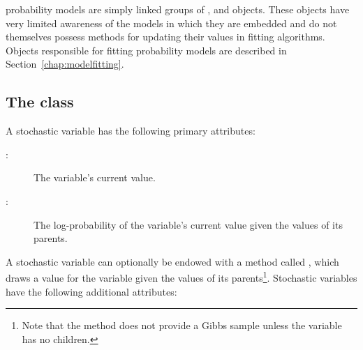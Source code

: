 \documentclass[]{jss}
\begin{document}
\medskip
{} probability models are simply linked groups of ,  and  objects. These objects have very limited awareness of the models in which they are embedded and do not themselves possess methods for updating their values in fitting algorithms. Objects responsible for fitting probability models are described in Section~\ref{chap:modelfitting}.



\subsection[The Stochastic class]{The  class}
\label{stochastic}


A stochastic variable has the following primary attributes:
\begin{description}
    \item[:] The variable's current value.
    \item[:] The log-probability of the variable's current value given the values of its parents.
\end{description}
A stochastic variable can optionally be endowed with a method called , which draws a value for the variable given the values of its parents\footnote{Note that the  method does not provide a Gibbs sample unless the variable has no children.}. Stochastic variables have the following additional attributes:
\end{document}
